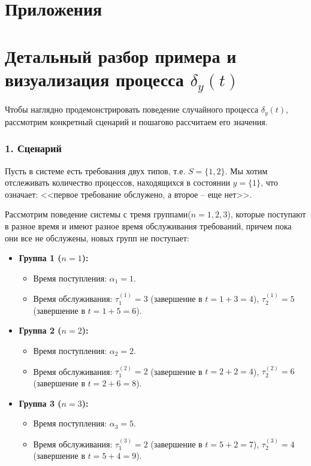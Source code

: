 \documentclass[12pt]{article}
\theoremstyle{plain}
\theoremstyle{definition}
\theoremstyle{remark}
\begin{document}
\newpage
\appendix
\renewcommand{\thesection}{\Asbuk{section}}

\section*{Приложения}

\titleformat{\section}{\normalfont\Large\bfseries}{Приложение \thesection.}{0.5em}{}

\section{Детальный разбор примера и визуализация процесса $\delta_y(t)$}
\label{app:example}

Чтобы наглядно продемонстрировать поведение случайного процесса $\delta_y(t)$, рассмотрим конкретный сценарий и пошагово рассчитаем его значения.

\subsubsection*{1. Сценарий}

Пусть в системе есть требования двух типов, т.е. $S = \{1, 2\}$. Мы хотим отслеживать количество процессов, находящихся в состоянии $y = \{1\}$, что означает: <<первое требование обслужено, а второе -- еще нет>>.

Рассмотрим поведение системы с тремя группами($n=1, 2, 3$), которые поступают в разное время и имеют разное время обслуживания требований, причем пока они все не обслужены, новых групп не поступает:
\begin{itemize}
    \item \textbf{Группа 1 ($n=1$):}
    \begin{itemize}
        \item Время поступления: $\alpha_1 = 1$.
        \item Время обслуживания: $\tau_1^{(1)} = 3$ (завершение в $t=1+3=4$), $\tau_2^{(1)} = 5$ (завершение в $t=1+5=6$).
    \end{itemize}
    \item \textbf{Группа 2 ($n=2$):}
    \begin{itemize}
        \item Время поступления: $\alpha_2 = 2$.
        \item Время обслуживания: $\tau_1^{(2)} = 2$ (завершение в $t=2+2=4$), $\tau_2^{(2)} = 6$ (завершение в $t=2+6=8$).
    \end{itemize}
    \item \textbf{Группа 3 ($n=3$):}
    \begin{itemize}
        \item Время поступления: $\alpha_3 = 5$.
        \item Время обслуживания: $\tau_1^{(3)} = 2$ (завершение в $t=5+2=7$), $\tau_2^{(3)} = 4$ (завершение в $t=5+4=9$).
    \end{itemize}
\end{itemize}
\end{document}
